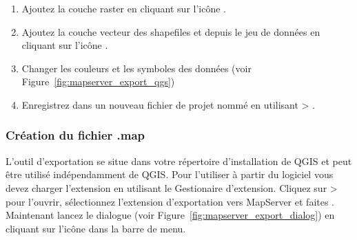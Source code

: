 \begin{enumerate}
\item Ajoutez la couche raster  en cliquant sur l'icône .
\item Ajoutez la couche vecteur des shapefiles  et  depuis le jeu de données en cliquant sur l'icône .
\item Changer les couleurs et les symboles des données (voir Figure~\ref{fig:mapserver_export_qgs})
\item Enregistrez dans un nouveau fichier de projet nommé  en utilisant  > .
\end{enumerate} 

%

\subsubsection{Création du fichier .map}

L'outil  d'exportation se situe dans votre répertoire d'installation de QGIS et peut être utilisé indépendamment de QGIS. Pour l'utiliser à partir du logiciel vous devez charger l'extension en utilisant le Gestionaire d'extension. Cliquez sur  >  pour l'ouvrir, sélectionnez l'extension d'exportation vers MapServer et faites . Maintenant lancez le dialogue  (voir Figure~\ref{fig:mapserver_export_dialog}) en cliquant sur l'icône dans la barre de menu.

